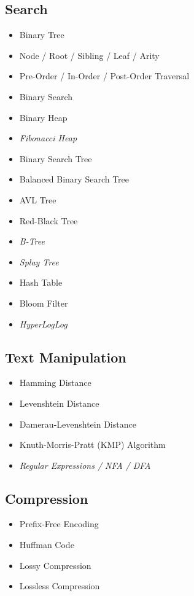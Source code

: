 \documentclass[10pt,a4paper]{article}
\begin{document}
\begin{landscape}
\begin{multicols*}{4}
\subsection*{Search}
\begin{itemize}
    \item Binary Tree
    \item Node / Root / Sibling / Leaf / Arity
    \item Pre-Order / In-Order / Post-Order Traversal
    \item Binary Search
    \item Binary Heap
    \item \textit{Fibonacci Heap}
    \item Binary Search Tree
    \item Balanced Binary Search Tree
    \item AVL Tree
    \item Red-Black Tree
    \item \textit{B-Tree}
    \item \textit{Splay Tree}
    \item Hash Table
    \item Bloom Filter
    \item \textit{HyperLogLog}
\end{itemize}

\subsection*{Text Manipulation}
\begin{itemize}
    \item Hamming Distance
    \item Levenshtein Distance
    \item Damerau-Levenshtein Distance
    \item Knuth-Morris-Pratt (KMP) Algorithm
    \item \textit{Regular Expressions / NFA / DFA}
\end{itemize}

\subsection*{Compression}
\begin{itemize}
    \item Prefix-Free Encoding
    \item Huffman Code
    \item Lossy Compression
    \item Lossless Compression
\end{itemize}


\end{multicols*}
\end{landscape}
\end{document}

